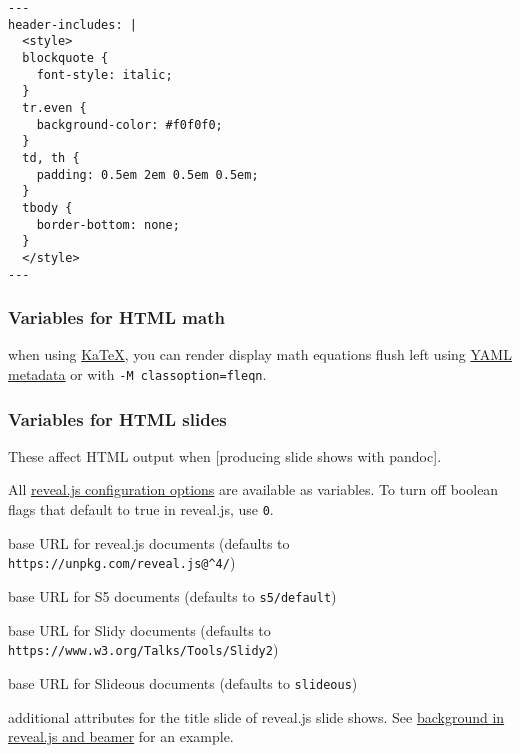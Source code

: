 \documentclass[]{article}
\providecommand{\tightlist}{%
  \setlength{\itemsep}{0pt}\setlength{\parskip}{0pt}}
\begin{document}
\begin{verbatim}
---
header-includes: |
  <style>
  blockquote {
    font-style: italic;
  }
  tr.even {
    background-color: #f0f0f0;
  }
  td, th {
    padding: 0.5em 2em 0.5em 0.5em;
  }
  tbody {
    border-bottom: none;
  }
  </style>
---
\end{verbatim}

\hypertarget{variables-for-html-math}{%
\subsubsection{Variables for HTML math}\label{variables-for-html-math}}

\begin{description}
\tightlist
\item[\texttt{classoption}]
when using \protect\hyperlink{option--katex}{KaTeX}, you can render
display math equations flush left using \protect\hyperlink{layout}{YAML
metadata} or with \texttt{-M\ classoption=fleqn}.
\end{description}

\hypertarget{variables-for-html-slides}{%
\subsubsection{Variables for HTML
slides}\label{variables-for-html-slides}}

These affect HTML output when {[}producing slide shows with pandoc{]}.

All \href{https://revealjs.com/config/}{reveal.js configuration options}
are available as variables. To turn off boolean flags that default to
true in reveal.js, use \texttt{0}.

\begin{description}
\tightlist
\item[\texttt{revealjs-url}]
base URL for reveal.js documents (defaults to
\texttt{https://unpkg.com/reveal.js@\^{}4/})
\item[\texttt{s5-url}]
base URL for S5 documents (defaults to \texttt{s5/default})
\item[\texttt{slidy-url}]
base URL for Slidy documents (defaults to
\texttt{https://www.w3.org/Talks/Tools/Slidy2})
\item[\texttt{slideous-url}]
base URL for Slideous documents (defaults to \texttt{slideous})
\item[\texttt{title-slide-attributes}]
additional attributes for the title slide of reveal.js slide shows. See
\protect\hyperlink{background-in-reveal.js-and-beamer}{background in
reveal.js and beamer} for an example.
\end{description}
\end{document}

